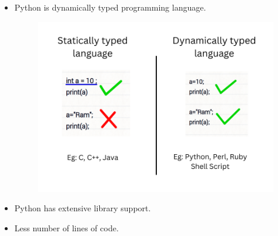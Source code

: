 

\begin{flushleft}

	
	\bigskip

	
	\begin{itemize}

		\item Python is dynamically typed programming language.

		\begin{figure}[h!]

			\centering

			\includegraphics[scale=0.6]{content/chapter0/images/static.png}

		\end{figure}

		
		\item Python has extensive library support.
		
		\item Less number of lines of code.	
	\end{itemize}

	
\end{flushleft}


\newpage



